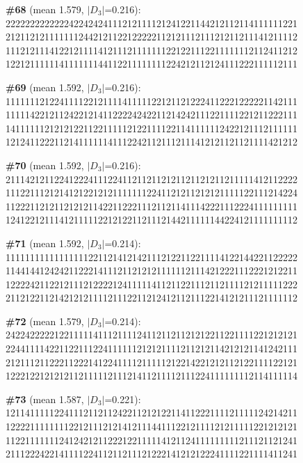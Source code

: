 \documentclass[10pt]{article}
\begin{document}
\noindent\textbf{\#68} (mean 1.579, $|D_3|$=0.216):\\
222222222222242242424111212111121241221144212112114111111221\\
212112121111111244212112212222211212111211121211211141211112\\
111212111412212111141211121111111221221112211111112112411212\\
122121111114111111144112211111111224212112124111222111112111\medskip

\noindent\textbf{\#69} (mean 1.592, $|D_3|$=0.216):\\
111111121224111122121111411111221211212224112221222221142111\\
111114221211242212141122224242211214242111221111221211222111\\
141111112121212211221111121221111221141111112422121112111111\\
121241122211214111111411122421121112111412121121121111421212\medskip

\noindent\textbf{\#70} (mean 1.592, $|D_3|$=0.216):\\
211142121122412224111224112112112121121121211211111412112222\\
111221112121412122121211111112241121211212121111122111214224\\
112221121211212121142211222111211211411142221112224111111111\\
124122121114121111122121221121112144211111144224121111111112\medskip

\noindent\textbf{\#71} (mean 1.592, $|D_3|$=0.214):\\
111111111111111112211214121421112122112211114122144221122222\\
114414412424211222141112112121211111121114212221112221212211\\
122224211221211121222212411111411211221112112111121211111222\\
211212211214212121111211122112124121121112214121211121111112\medskip

\noindent\textbf{\#72} (mean 1.579, $|D_3|$=0.214):\\
242242222212211111411121111241121121121212211221111221212121\\
224411114221122111224111111212121111211212114212121141242111\\
212111211222112221412241111211111212214221212112122111122121\\
122212212121211211111211121411211112111224111111112114111114\medskip

\noindent\textbf{\#73} (mean 1.587, $|D_3|$=0.221):\\
121141111122411121121124221121212211411222111121111124214211\\
122221111111122121112121412111441112212111121211111221212121\\
112211111112412421211222122111114121124111111111211121121241\\
211122242214111122411211211121222141212122241111221111411241\medskip
\end{document}
